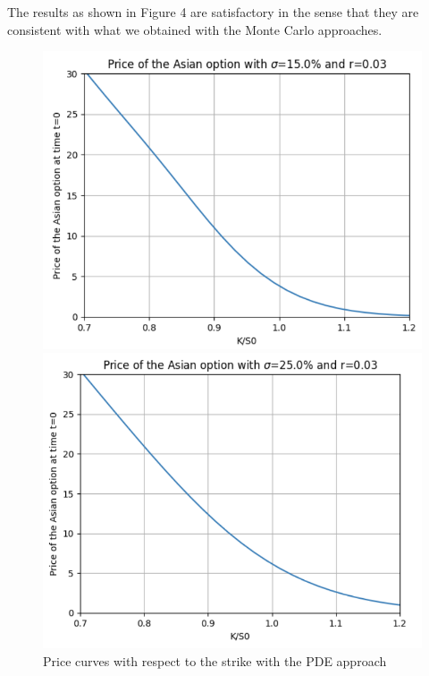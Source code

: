 \documentclass{article}
\begin{document}
The results as shown in Figure 4 are satisfactory in the sense that they are consistent with what we obtained
with the Monte Carlo approaches. 
\begin{figure}[h]
  \centering
  \begin{minipage}{0.45\textwidth}
    \centering
    \includegraphics[width=\textwidth]{charts/Price_alone15.png}
  
  \end{minipage}\hfill
  \begin{minipage}{0.45\textwidth}
    \centering
    \includegraphics[width=\textwidth]{charts/Price_alone_25.png}
    
  \end{minipage}
  \caption{Price curves with respect to the strike with the PDE approach}
\end{figure}
\end{document}
